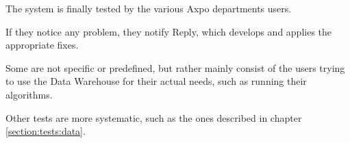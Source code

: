 The system is finally tested by the various Axpo departments users.

If they notice any problem, they notify Reply, which develops and applies the appropriate fixes.

Some are not specific or predefined, but rather mainly consist of the users trying to use the Data Warehouse for their actual needs, such as running their algorithms.

Other tests are more systematic, such as the ones described in chapter \ref{section:tests:data}.
